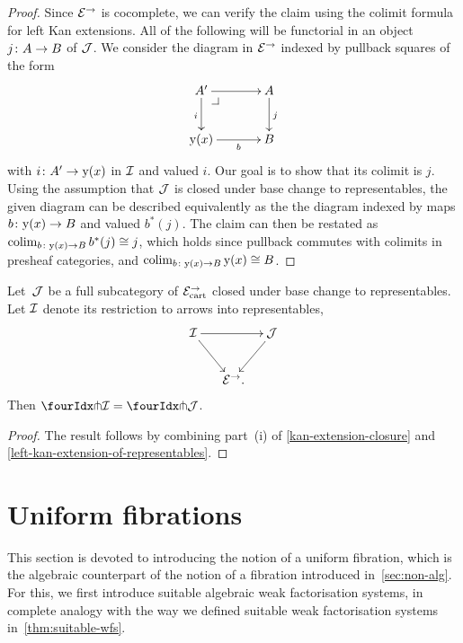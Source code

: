\documentclass[reqno,10pt,a4paper,oneside,draft]{amsart}
\begin{document}
{{\begin{proof}
Since $\catE^\to$ is cocomplete, we can verify the claim using the colimit formula for left Kan extensions.
All of the following will be functorial in an object $j \co A \to B$ of $\cal{J}$.
We consider the diagram in $\catE^\to$ indexed by pullback squares of the form
\[
\xymatrix@C=1.2cm{
  A'
  \ar[r]
  \ar[d]_{i}
  \pullback{dr}
&
  A
  \ar[d]^{j}
\\
  \yon(x)
  \ar[r]_-{b}
&
  B
}
\]
with $i \co A' \to \yon(x)$ in $\cal{I}$ and valued $i$.
Our goal is to show that its colimit is $j$.
Using the assumption that $\cal{J}$ is closed under base change to representables, the given diagram can be described equivalently as the the diagram indexed by maps $b \co \yon(x) \to B$ and valued $b^*(j)$.
The claim can then be restated as $\colim_{b \co \yon(x) \to B} b^*(j) \iso j$, which holds since pullback commutes with colimits in presheaf categories, and $\colim_{b \co \yon(x) \to B} \yon(x) \iso B$.
\end{proof}

\begin{proposition} \label{awfs-on-arrows-into-representables}
Let~$\cal{J}$ be a full subcategory of $\catE_{\cart}^\to$ closed under base change to representables.
Let $\cal{I}$ denote its restriction to arrows into representables,
\[
\xymatrix@C-1em{
  \cal{I}
  \ar[rr]
  \ar[dr]
&&
  \cal{J}
  \ar[dl]
\\&
  \catE^\to
\rlap{.}}
\]
Then $\liftr{\cal{I}} = \liftr{\cal{J}}$.
\end{proposition}

\begin{proof}
The result follows by combining part~(i) of \cref{kan-extension-closure} and \cref{left-kan-extension-of-representables}.
\end{proof}

\newpage

\section{Uniform fibrations}
\label{sec:unif}

This section is devoted to introducing the notion of a uniform fibration, which is the algebraic counterpart of the notion of a fibration
introduced in~\cref{sec:non-alg}. For this, we first introduce suitable algebraic weak factorisation systems, in complete analogy with
the way we defined suitable weak factorisation systems in~\cref{thm:suitable-wfs}. 

}}
\end{document}
